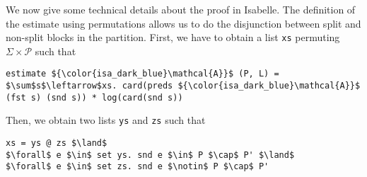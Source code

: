 \documentclass[12pt, a4 paper]{article}
\theoremstyle{definition}
\begin{document}
\bigskip

We now give some technical details about the proof in Isabelle. The definition of the estimate using permutations allows us to do the disjunction between split and non-split blocks in the partition. First, we have to obtain a list \texttt{xs} permuting $\Sigma \times \mathcal{P}$ such that
\begin{lstlisting}[language=Isabelle]
estimate ${\color{isa_dark_blue}\mathcal{A}}$ (P, L) = $\sum$s$\leftarrow$xs. card(preds ${\color{isa_dark_blue}\mathcal{A}}$ (fst s) (snd s)) * log(card(snd s))
\end{lstlisting}
Then, we obtain two lists \texttt{ys} and \texttt{zs} such that
\begin{lstlisting}[language=Isabelle]
xs = ys @ zs $\land$
$\forall$ e $\in$ set ys. snd e $\in$ P $\cap$ P' $\land$
$\forall$ e $\in$ set zs. snd e $\notin$ P $\cap$ P'
\end{lstlisting}


% 

\pagebreak


\end{document}
